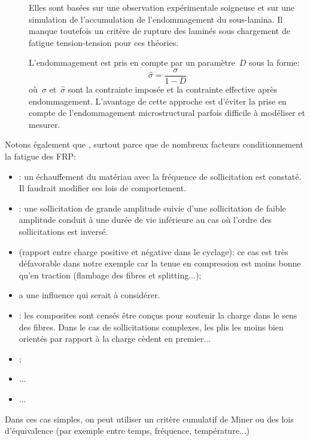 \begin{description}
  \item[] Elles sont basées
     sur une observation expérimentale soigneuse et sur une
     simulation de l'accumulation de l'endommagement du
     sous-lamina.
     Il manque toutefois un critère de rupture des laminés sous
     chargement de fatigue tension-tension pour ces théories.
  \item[] L'endommagement
     est pris en compte par un paramètre~$D$ sous la forme:
     \begin{equation}
      \widehat{\sigma}=\dfrac{\sigma}{1-D}
     \end{equation}
     où~$\sigma$ et~$\widehat{\sigma}$ sont la contrainte
     imposée et la contrainte effective après endommagement.
     L'avantage de cette approche est d'éviter la prise en
     compte de l'endommagement microstructural parfois difficile
     à modéliser et mesurer.
\end{description}
\medskipvm
Notons également que , surtout parce que de nombreux facteurs conditionnement la fatigue des FRP:
\begin{itemize}
	\item {}: un échauffement du matériau avec la fréquence de sollicitation est constaté. Il faudrait modifier ses lois de comportement.
	\item {}: une sollicitation de grande amplitude suivie d'une sollicitation de faible amplitude conduit à une durée de vie inférieure au cas où l'ordre des sollicitations est inversé.
	\item {} (rapport entre charge positive et négative dans le cyclage): ce cas est très défavorable dans notre exemple car la tenue en compression est moins bonne qu'en traction (flambage des fibres et splitting...);
	\item {} a une influence qui serait à considérer.
	\item {}: les composites sont censés être conçus pour soutenir la charge dans le sens des fibres. Dans le cas de sollicitations complexes, les plis les moins bien orientés par rapport à la charge cèdent en premier...
	\item {};
	\item {}...
	\item ...
\end{itemize}
\medskipvm
Dans ces cas simples, on peut utiliser un critère cumulatif de Miner ou des lois d'équivalence (par exemple entre temps, fréquence, température...)


